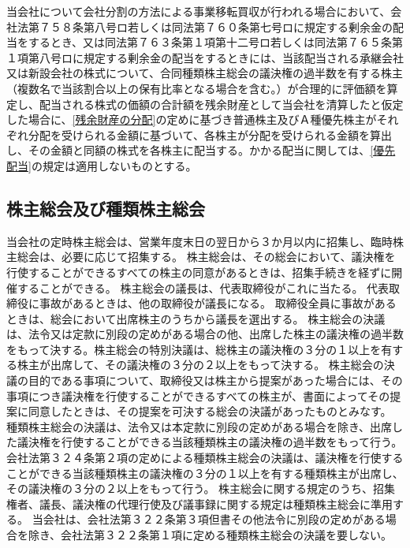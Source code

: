 \documentclass[10pt,a4paper,uplatex]{jsarticle}
\begin{document}
\term 当会社について会社分割の方法による事業移転買収が行われる場合において、会社法第７５８条第八号ロ若しくは同法第７６０条第七号ロに規定する剰余金の配当をするとき、又は同法第７６３条第１項第十二号ロ若しくは同法第７６５条第１項第八号ロに規定する剰余金の配当をするときには、当該配当される承継会社又は新設会社の株式について、合同種類株主総会の議決権の過半数を有する株主（複数名で当該割合以上の保有比率となる場合を含む。）が合理的に評価額を算定し、配当される株式の価額の合計額を残余財産として当会社を清算したと仮定した場合に、\ref{残余財産の分配}の定めに基づき普通株主及びＡ種優先株主がそれぞれ分配を受けられる金額に基づいて、各株主が分配を受けられる金額を算出し、その金額と同額の株式を各株主に配当する。かかる配当に関しては、\ref{優先配当}の規定は適用しないものとする。

\subsection{株主総会及び種類株主総会}
当会社の定時株主総会は、営業年度末日の翌日から３か月以内に招集し、臨時株主総会は、必要に応じて招集する。
株主総会は、その総会において、議決権を行使することができるすべての株主の同意があるときは、招集手続きを経ずに開催することができる。
株主総会の議長は、代表取締役がこれに当たる。
\term 代表取締役に事故があるときは、他の取締役が議長になる。
\term 取締役全員に事故があるときは、総会において出席株主のうちから議長を選出する。
株主総会の決議は、法令又は定款に別段の定めがある場合の他、出席した株主の議決権の過半数をもって決する。株主総会の特別決議は、総株主の議決権の３分の１以上を有する株主が出席して、その議決権の３分の２以上をもって決する。
株主総会の決議の目的である事項について、取締役又は株主から提案があった場合には、その事項につき議決権を行使することができるすべての株主が、書面によってその提案に同意したときは、その提案を可決する総会の決議があったものとみなす。
種類株主総会の決議は、法令又は本定款に別段の定めがある場合を除き、出席した議決権を行使することができる当該種類株主の議決権の過半数をもって行う。
\label{種類株主総会}
\term 会社法第３２４条第２項の定めによる種類株主総会の決議は、議決権を行使することができる当該種類株主の議決権の３分の１以上を有する種類株主が出席し、その議決権の３分の２以上をもって行う。
\term 株主総会に関する規定のうち、招集権者、議長、議決権の代理行使及び議事録に関する規定は種類株主総会に準用する。
\term 当会社は、会社法第３２２条第３項但書その他法令に別段の定めがある場合を除き、会社法第３２２条第１項に定める種類株主総会の決議を要しない。
\end{document}

